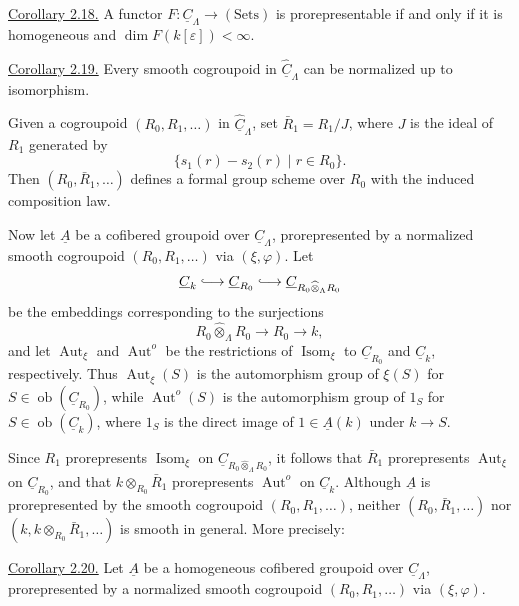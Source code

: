 
\underline{Corollary 2.18.} A functor
$F:\underline C_\Lambda\longrightarrow(\mathrm{Sets})$ is
prorepresentable if and only if it is homogeneous and
$\dim F(k[\varepsilon])<\infty$.

\underline{Corollary 2.19.} Every smooth cogroupoid in
$\widehat{\underline C}_\Lambda$ can be normalized up to isomorphism.

Given a cogroupoid $(R_0,R_1,\ldots)$ in
$\widehat{\underline C}_\Lambda$, set $\bar R_1=R_1/J$, where $J$ is
the ideal of $R_1$ generated by
\[
 \{s_1(r)-s_2(r)\mid r\in R_0\}.
\]
Then $(R_0,\bar R_1,\ldots)$ defines a formal group scheme over $R_0$
with the induced composition law.

Now let $\underline A$ be a cofibered groupoid over
$\underline C_\Lambda$, prorepresented by a normalized smooth
cogroupoid $(R_0,R_1,\ldots)$ via $(\xi,\varphi)$. Let
\[
 \underline C_k\lhook\joinrel\longrightarrow
 \underline C_{R_0}\lhook\joinrel\longrightarrow
 \underline C_{R_0\widehat\otimes_\Lambda R_0}
\]
be the embeddings corresponding to the surjections
\[
 R_0\widehat\otimes_\Lambda R_0\longrightarrow R_0\longrightarrow k,
\]
and let $\operatorname{Aut}_\xi$ and $\operatorname{Aut}^{o}$ be the
restrictions of $\operatorname{Isom}_\xi$ to
$\underline C_{R_0}$ and $\underline C_k$, respectively. Thus
$\operatorname{Aut}_\xi(S)$ is the automorphism group of $\xi(S)$ for
$S\in\operatorname{ob}(\underline C_{R_0})$, while
$\operatorname{Aut}^{o}(S)$ is the automorphism group of $1_S$ for
$S\in\operatorname{ob}(\underline C_k)$, where $1_S$ is the direct
image of $1\in\underline A(k)$ under $k\longrightarrow S$.

Since $R_1$ prorepresents $\operatorname{Isom}_\xi$ on
$\underline C_{R_0\widehat\otimes_\Lambda R_0}$, it follows that
$\bar R_1$ prorepresents $\operatorname{Aut}_\xi$ on
$\underline C_{R_0}$, and that
$k\otimes_{R_0}\bar R_1$ prorepresents $\operatorname{Aut}^{o}$ on
$\underline C_k$. Although $\underline A$ is prorepresented by the
smooth cogroupoid $(R_0,R_1,\ldots)$, neither
$(R_0,\bar R_1,\ldots)$ nor
$(k,k\otimes_{R_0}\bar R_1,\ldots)$ is smooth in general. More
precisely:

\underline{Corollary 2.20.} Let $\underline A$ be a homogeneous
cofibered groupoid over $\underline C_\Lambda$, prorepresented by a
normalized smooth cogroupoid $(R_0,R_1,\ldots)$ via
$(\xi,\varphi)$.

